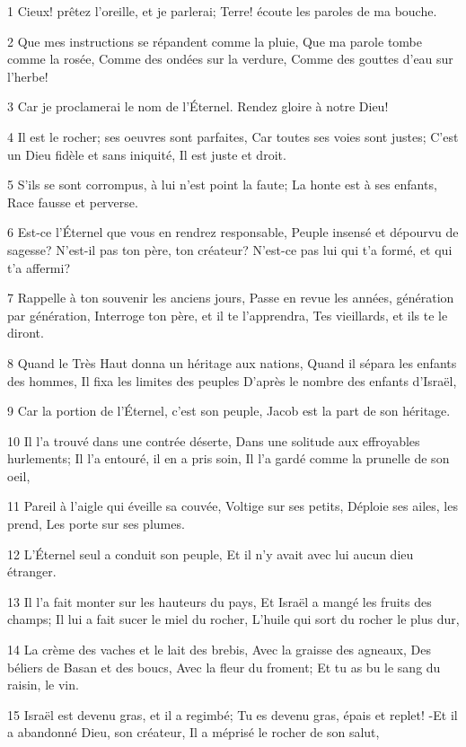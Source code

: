 \par 1 Cieux! prêtez l'oreille, et je parlerai; Terre! écoute les paroles de ma bouche.
\par 2 Que mes instructions se répandent comme la pluie, Que ma parole tombe comme la rosée, Comme des ondées sur la verdure, Comme des gouttes d'eau sur l'herbe!
\par 3 Car je proclamerai le nom de l'Éternel. Rendez gloire à notre Dieu!
\par 4 Il est le rocher; ses oeuvres sont parfaites, Car toutes ses voies sont justes; C'est un Dieu fidèle et sans iniquité, Il est juste et droit.
\par 5 S'ils se sont corrompus, à lui n'est point la faute; La honte est à ses enfants, Race fausse et perverse.
\par 6 Est-ce l'Éternel que vous en rendrez responsable, Peuple insensé et dépourvu de sagesse? N'est-il pas ton père, ton créateur? N'est-ce pas lui qui t'a formé, et qui t'a affermi?
\par 7 Rappelle à ton souvenir les anciens jours, Passe en revue les années, génération par génération, Interroge ton père, et il te l'apprendra, Tes vieillards, et ils te le diront.
\par 8 Quand le Très Haut donna un héritage aux nations, Quand il sépara les enfants des hommes, Il fixa les limites des peuples D'après le nombre des enfants d'Israël,
\par 9 Car la portion de l'Éternel, c'est son peuple, Jacob est la part de son héritage.
\par 10 Il l'a trouvé dans une contrée déserte, Dans une solitude aux effroyables hurlements; Il l'a entouré, il en a pris soin, Il l'a gardé comme la prunelle de son oeil,
\par 11 Pareil à l'aigle qui éveille sa couvée, Voltige sur ses petits, Déploie ses ailes, les prend, Les porte sur ses plumes.
\par 12 L'Éternel seul a conduit son peuple, Et il n'y avait avec lui aucun dieu étranger.
\par 13 Il l'a fait monter sur les hauteurs du pays, Et Israël a mangé les fruits des champs; Il lui a fait sucer le miel du rocher, L'huile qui sort du rocher le plus dur,
\par 14 La crème des vaches et le lait des brebis, Avec la graisse des agneaux, Des béliers de Basan et des boucs, Avec la fleur du froment; Et tu as bu le sang du raisin, le vin.
\par 15 Israël est devenu gras, et il a regimbé; Tu es devenu gras, épais et replet! -Et il a abandonné Dieu, son créateur, Il a méprisé le rocher de son salut,
